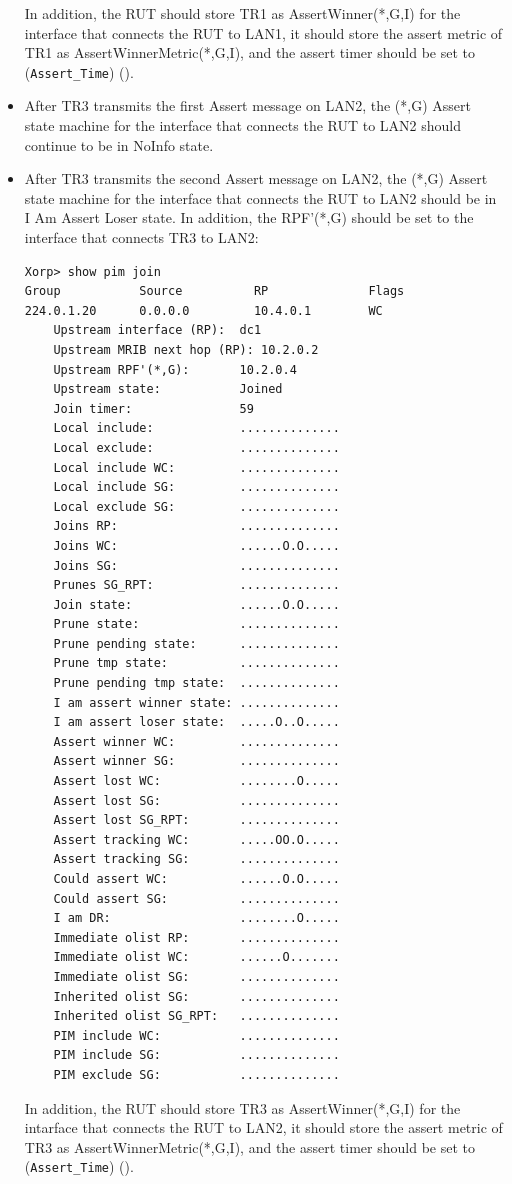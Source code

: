 \documentclass[11pt]{report}
\begin{document}
\begin{itemize}
  In addition, the RUT should store TR1 as AssertWinner(*,G,I) for the
  interface that connects the RUT to LAN1, it should store the assert metric
  of TR1 as AssertWinnerMetric(*,G,I), and the assert timer should be set to
  (\verb=Assert_Time=) ({\PimsmAssertTime}).

  \item After TR3 transmits the first Assert message on LAN2, the (*,G) Assert
  state machine for the interface that connects the RUT to LAN2 should
  continue to be in NoInfo state.

  \item After TR3 transmits the second Assert message on LAN2, the (*,G) Assert
  state machine for the interface that connects the RUT to LAN2 should be in I
  Am Assert Loser state. In addition,
  the RPF'(*,G) should be set to the interface that connects TR3
  to LAN2:

\begin{verbatim}
Xorp> show pim join 
Group           Source          RP              Flags
224.0.1.20      0.0.0.0         10.4.0.1        WC   
    Upstream interface (RP):  dc1
    Upstream MRIB next hop (RP): 10.2.0.2
    Upstream RPF'(*,G):       10.2.0.4
    Upstream state:           Joined 
    Join timer:               59
    Local include:            ..............
    Local exclude:            ..............
    Local include WC:         ..............
    Local include SG:         ..............
    Local exclude SG:         ..............
    Joins RP:                 ..............
    Joins WC:                 ......O.O.....
    Joins SG:                 ..............
    Prunes SG_RPT:            ..............
    Join state:               ......O.O.....
    Prune state:              ..............
    Prune pending state:      ..............
    Prune tmp state:          ..............
    Prune pending tmp state:  ..............
    I am assert winner state: ..............
    I am assert loser state:  .....O..O.....
    Assert winner WC:         ..............
    Assert winner SG:         ..............
    Assert lost WC:           ........O.....
    Assert lost SG:           ..............
    Assert lost SG_RPT:       ..............
    Assert tracking WC:       .....OO.O.....
    Assert tracking SG:       ..............
    Could assert WC:          ......O.O.....
    Could assert SG:          ..............
    I am DR:                  ........O.....
    Immediate olist RP:       ..............
    Immediate olist WC:       ......O.......
    Immediate olist SG:       ..............
    Inherited olist SG:       ..............
    Inherited olist SG_RPT:   ..............
    PIM include WC:           ..............
    PIM include SG:           ..............
    PIM exclude SG:           ..............
\end{verbatim}

  In addition, the RUT should store TR3 as AssertWinner(*,G,I) for the
  intarface that connects the RUT to LAN2, it should store the assert metric
  of TR3 as AssertWinnerMetric(*,G,I), and the assert timer should be set to
  (\verb=Assert_Time=) ({\PimsmAssertTime}).

\end{itemize}
\end{document}
